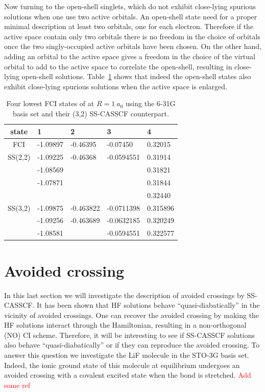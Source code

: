 \documentclass[aps,prb,reprint,showkeys,superscriptaddress]{revtex4-1}
\newcommand{\todo}[1]{\textcolor{red}{#1}}
\begin{document}
Now turning to the open-shell singlets, which do not exhibit close-lying spurious solutions when one use two active orbitals.
An open-shell state need for a proper minimal description at least two orbitals, one for each electron.
Therefore if the active space contain only two orbitals there is no freedom in the choice of orbitals once the two singly-occupied active orbitals have been chosen.
On the other hand, adding an orbital to the active space gives a freedom in the choice of the virtual orbital to add to the active space to correlate the open-shell, resulting in close-lying open-shell solutions.
Table~\ref{tab:tab_3} shows that indeed the open-shell states also exhibit close-lying spurious solutions when the active space is enlarged.

\begin{table}
  \caption{Four lowest FCI states of  at $R=1~a_0$ using the 6-31G basis set and their (3,2) SS-CASSCF counterpart.}
  \begin{ruledtabular}
    \label{tab:tab_3}
    \begin{tabular}{cllll}
      state & 1  & 2 & 3 & 4 \\
      \hline
      FCI & -1.09897 & -0.46395 & -0.07450 & 0.32015 \\
      \hline
      SS(2,2) & -1.09225 & -0.46368 & -0.0594551 & 0.31914 \\
            & -1.08569 &  &  & 0.31821 \\
            & -1.07871 &  &  & 0.31844 \\
            &  &  &  & 0.32440 \\
      \hline
      SS(3,2) & -1.09875 & -0.463822 & -0.0711398 & 0.315896 \\
            & -1.09256 & -0.463689 & -0.0632185 & 0.320249 \\
            & -1.08581 &  & -0.0594551 & 0.322577 \\
    \end{tabular}
  \end{ruledtabular}
\end{table}

\section{Avoided crossing}
\label{sec:avoided}

In this last section we will investigate the description of avoided crossings by SS-CASSCF.
It has been shown that HF solutions behave ``quasi-diabatically'' in the vicinity of avoided crossings. \cite{Thom_2009}
One can recover the avoided crossing by making the HF solutions interact through the Hamiltonian, resulting in a non-orthogonal (NO) CI scheme. \cite{Burton_2019}
Therefore, it will be interesting to see if SS-CASSCF solutions also behave ``quasi-diabatically'' or if they can reproduce the avoided crossing.
To answer this question we investigate the LiF molecule in the STO-3G basis set.
Indeed, the ionic ground state of this molecule at equilibrium undergoes an avoided crossing with a covalent excited state when the bond is stretched. \cite{Thom_2009,Mahler_2021} \todo{Add some ref}
\end{document}
